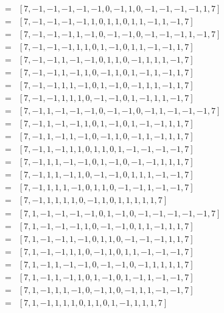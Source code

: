 \documentclass[12pt]{article}
\theoremstyle{plain}
\theoremstyle{definition}
\theoremstyle{remark}
\theoremstyle{definition}
\begin{document}
\begin{eqnarray*}
    [w_{1}, ..., w_{16}] & = & [7, -1, -1, -1, -1, -1, 0, -1, 1, 0, -1, -1, -1, -1, 1, 7] \\
    & = & [7, -1, -1, -1, -1, 1, 0, 1, 1, 0, 1, 1, -1, 1, -1, 7] \\
    & = & [7, -1, -1, -1, 1, -1, 0, -1, -1, 0, -1, -1, -1, 1, -1, 7] \\
    & = & [7, -1, -1, -1, 1, 1, 0, 1, -1, 0, 1, 1, -1, -1, 1, 7] \\
    & = & [7, -1, -1, 1, -1, -1, 0, 1, 1, 0, -1, 1, 1, 1, -1, 7] \\
    & = & [7, -1, -1, 1, -1, 1, 0, -1, 1, 0, 1, -1, 1, -1, 1, 7] \\
    & = & [7, -1, -1, 1, 1, -1, 0, 1, -1, 0, -1, 1, 1, -1, 1, 7] \\
    & = & [7, -1, -1, 1, 1, 1, 0, -1, -1, 0, 1, -1, 1, 1, -1, 7] \\
    & = & [7, -1, 1, -1, -1, -1, 0, -1, -1, 0, -1, 1, -1, -1, -1, 7] \\
    & = & [7, -1, 1, -1, -1, 1, 0, 1, -1, 0, 1, -1, -1, 1, 1, 7] \\
    & = & [7, -1, 1, -1, 1, -1, 0, -1, 1, 0, -1, 1, -1, 1, 1, 7] \\
    & = & [7, -1, 1, -1, 1, 1, 0, 1, 1, 0, 1, -1, -1, -1, -1, 7] \\
    & = & [7, -1, 1, 1, -1, -1, 0, 1, -1, 0, -1, -1, 1, 1, 1, 7] \\
    & = & [7, -1, 1, 1, -1, 1, 0, -1, -1, 0, 1, 1, 1, -1, -1, 7] \\
    & = & [7, -1, 1, 1, 1, -1, 0, 1, 1, 0, -1, -1, 1, -1, -1, 7] \\
    & = & [7, -1, 1, 1, 1, 1, 0, -1, 1, 0, 1, 1, 1, 1, 1, 7] \\
    & = & [7, 1, -1, -1, -1, -1, 0, 1, -1, 0, -1, -1, -1, -1, -1, 7] \\
    & = & [7, 1, -1, -1, -1, 1, 0, -1, -1, 0, 1, 1, -1, 1, 1, 7] \\
    & = & [7, 1, -1, -1, 1, -1, 0, 1, 1, 0, -1, -1, -1, 1, 1, 7] \\
    & = & [7, 1, -1, -1, 1, 1, 0, -1, 1, 0, 1, 1, -1, -1, -1, 7] \\
    & = & [7, 1, -1, 1, -1, -1, 0, -1, -1, 0, -1, 1, 1, 1, 1, 7] \\
    & = & [7, 1, -1, 1, -1, 1, 0, 1, -1, 0, 1, -1, 1, -1, -1, 7] \\
    & = & [7, 1, -1, 1, 1, -1, 0, -1, 1, 0, -1, 1, 1, -1, -1, 7] \\
    & = & [7, 1, -1, 1, 1, 1, 0, 1, 1, 0, 1, -1, 1, 1, 1, 7] \\

\end{eqnarray*}
\end{document}
